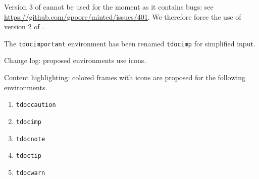 \documentclass[12pt, a4paper]{article}
\begin{document}
\begin{tdocprob}
	\item Version 3 of  cannot be used for the moment as it contains bugs: see \url{https://github.com/gpoore/minted/issues/401}. We therefore force the use of version 2 of .
\end{tdocprob}


\begin{tdocbreak}
	\item The \verb#tdocimportant# environment has been renamed \verb#tdocimp# for simplified input.
\end{tdocbreak}


\begin{tdocnew}
    \item Change log: proposed environments use icons.


    \item Content highlighting: colored frames with icons are proposed for the following environments.
    \bgroup
    \setlength{multicolsep}{3.0pt plus 1.0pt minus 0.75pt}
    \begin{multicols}{3}
        \begin{enumerate}
        	\item \verb#tdoccaution#
        	\item \verb#tdocimp#
        	\item \verb#tdocnote#
        	\item \verb#tdoctip#
        	\item \verb#tdocwarn#
        \end{enumerate}
    \end{multicols}
    \egroup
\end{tdocnew}
\end{document}
